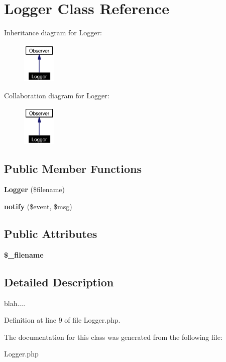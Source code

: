 \section{Logger Class Reference}
\label{classLogger}
Inheritance diagram for Logger:\begin{figure}[H]
\begin{center}
\leavevmode
\includegraphics[width=45pt]{classLogger__inherit__graph}
\end{center}
\end{figure}
Collaboration diagram for Logger:\begin{figure}[H]
\begin{center}
\leavevmode
\includegraphics[width=45pt]{classLogger__coll__graph}
\end{center}
\end{figure}
\subsection*{Public Member Functions}
\begin{CompactItemize}
\item 
{\bf Logger} (\$filename)\label{classLogger_a0}

\item 
{\bf notify} (\$event, \$msg)\label{classLogger_a1}

\end{CompactItemize}
\subsection*{Public Attributes}
\begin{CompactItemize}
\item 
{\bf \$\_\-filename}\label{classLogger_o0}

\end{CompactItemize}


\subsection{Detailed Description}
blah.... 



Definition at line 9 of file Logger.php.

The documentation for this class was generated from the following file:\begin{CompactItemize}
\item 
Logger.php\end{CompactItemize}
